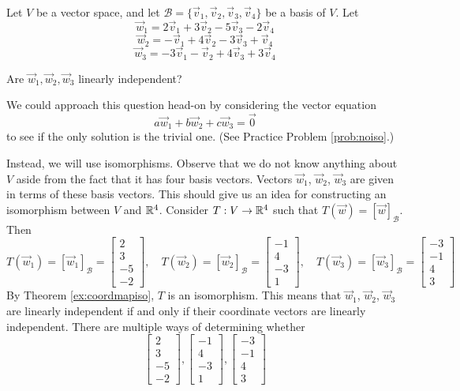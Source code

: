 \documentclass{ximera}
\begin{document}
\begin{example}\label{ex:inverseimageoflinind}
Let $V$ be a vector space, and let $\mathcal{B}=\{\vec{v}_1, \vec{v}_2, \vec{v}_3, \vec{v}_4\}$ be a basis of $V$.  Let 
$$\vec{w}_1=2\vec{v}_1+3\vec{v}_2-5\vec{v}_3-2\vec{v}_4$$
$$\vec{w}_2=-\vec{v}_1+4\vec{v}_2-3\vec{v}_3+\vec{v}_4$$
$$\vec{w}_3=-3\vec{v}_1-\vec{v}_2+4\vec{v}_3+3\vec{v}_4$$

Are $\vec{w}_1, \vec{w}_2, \vec{w}_3$ linearly independent?
\begin{explanation}
We could approach this question head-on by considering the vector equation
$$a\vec{w}_1+b\vec{w}_2+c\vec{w}_3=\vec{0}$$
to see if the only solution is the trivial one. (See Practice Problem \ref{prob:noiso}.)

Instead, we will use isomorphisms.  Observe that we do not know anything about $V$ aside from the fact that it has four basis vectors.  Vectors $\vec{w}_1$, $\vec{w}_2$, $\vec{w}_3$ are given in terms of these basis vectors.  This should give us an idea for constructing an isomorphism between $V$ and $\mathbb{R}^4$.  Consider $T:V\rightarrow\mathbb{R}^4$ such that $T(\vec{w})=[\vec{w}]_{\mathcal{B}}$.
Then $$T(\vec{w}_1)=[\vec{w}_1]_{\mathcal{B}}=\begin{bmatrix}2\\3\\-5\\-2\end{bmatrix},\quad T(\vec{w}_2)=[\vec{w}_2]_{\mathcal{B}}=\begin{bmatrix}-1\\4\\-3\\1\end{bmatrix},\quad T(\vec{w}_3)=[\vec{w}_3]_{\mathcal{B}}=\begin{bmatrix}-3\\-1\\4\\3\end{bmatrix}$$
By Theorem \ref{ex:coordmapiso}, $T$   is an isomorphism.  This means that $\vec{w}_1$, $\vec{w}_2$, $\vec{w}_3$ are linearly independent if and only if their coordinate vectors are linearly independent.  There are multiple ways of determining whether 
$$\begin{bmatrix}2\\3\\-5\\-2\end{bmatrix}, \begin{bmatrix}-1\\4\\-3\\1\end{bmatrix}, \begin{bmatrix}-3\\-1\\4\\3\end{bmatrix}$$

\end{explanation}
\end{example}
\end{document}
